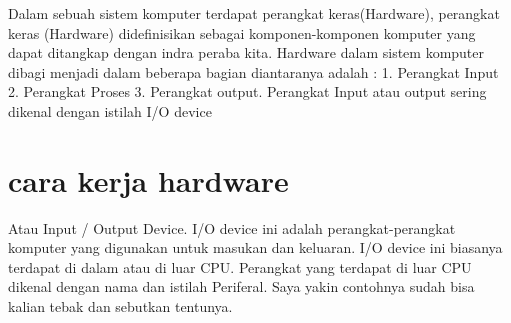 Dalam sebuah sistem komputer terdapat perangkat keras(Hardware), perangkat keras (Hardware) didefinisikan sebagai komponen-komponen komputer yang dapat ditangkap dengan indra peraba kita. Hardware dalam sistem komputer dibagi menjadi dalam beberapa bagian diantaranya adalah : 1. Perangkat Input 2. Perangkat Proses 3. Perangkat output. Perangkat Input atau output sering dikenal dengan istilah I/O device 

\section{cara kerja hardware}
Atau Input / Output Device. I/O device ini adalah perangkat-perangkat komputer yang digunakan untuk masukan dan keluaran. I/O device ini biasanya terdapat di dalam atau di luar CPU. Perangkat yang terdapat di luar CPU dikenal dengan nama dan istilah Periferal. Saya yakin contohnya sudah bisa kalian tebak dan sebutkan tentunya.